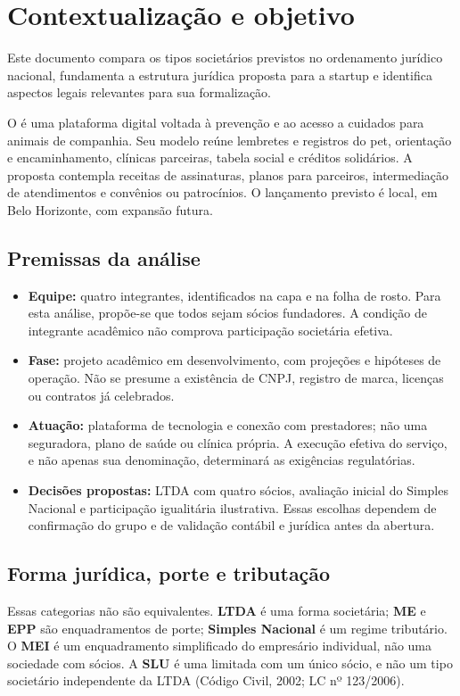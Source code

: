 \section{Contextualização e objetivo}
\label{sec:contexto}
Este documento compara os tipos societários previstos no ordenamento jurídico nacional, fundamenta a estrutura jurídica proposta para a startup e identifica aspectos legais relevantes para sua formalização.

O \projeto{} é uma plataforma digital voltada à prevenção e ao acesso a cuidados para animais de companhia. Seu modelo reúne lembretes e registros do pet, orientação e encaminhamento, clínicas parceiras, tabela social e créditos solidários. A proposta contempla receitas de assinaturas, planos para parceiros, intermediação de atendimentos e convênios ou patrocínios. O lançamento previsto é local, em Belo Horizonte, com expansão futura.

\subsection{Premissas da análise}
\begin{itemize}
\item \textbf{Equipe:} quatro integrantes, identificados na capa e na folha de rosto. Para esta análise, propõe-se que todos sejam sócios fundadores. A condição de integrante acadêmico não comprova participação societária efetiva.
\item \textbf{Fase:} projeto acadêmico em desenvolvimento, com projeções e hipóteses de operação. Não se presume a existência de CNPJ, registro de marca, licenças ou contratos já celebrados.
\item \textbf{Atuação:} plataforma de tecnologia e conexão com prestadores; não uma seguradora, plano de saúde ou clínica própria. A execução efetiva do serviço, e não apenas sua denominação, determinará as exigências regulatórias.
\item \textbf{Decisões propostas:} LTDA com quatro sócios, avaliação inicial do Simples Nacional e participação igualitária ilustrativa. Essas escolhas dependem de confirmação do grupo e de validação contábil e jurídica antes da abertura.
\end{itemize}

\subsection{Forma jurídica, porte e tributação}
Essas categorias não são equivalentes. \textbf{LTDA} é uma forma societária; \textbf{ME} e \textbf{EPP} são enquadramentos de porte; \textbf{Simples Nacional} é um regime tributário. O \textbf{MEI} é um enquadramento simplificado do empresário individual, não uma sociedade com sócios. A \textbf{SLU} é uma limitada com um único sócio, e não um tipo societário independente da LTDA (Código Civil, 2002; LC nº 123/2006).

